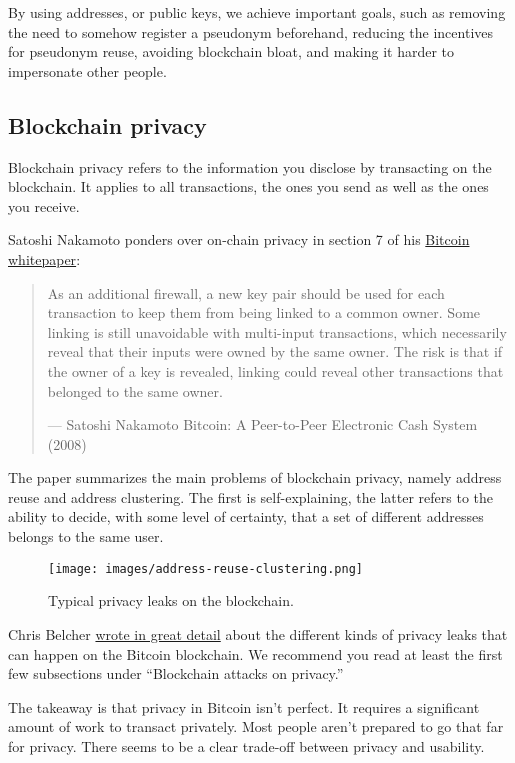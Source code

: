 By using addresses, or public keys, we achieve important goals, such as
removing the need to somehow register a pseudonym beforehand, reducing
the incentives for pseudonym reuse, avoiding blockchain bloat, and
making it harder to impersonate other people.

\hypertarget{blockchainprivacy}{%
\subsection{Blockchain privacy}\label{blockchainprivacy}}

Blockchain privacy refers to the information you disclose by transacting
on the blockchain. It applies to all transactions, the ones you send as
well as the ones you receive.

Satoshi Nakamoto ponders over on-chain privacy in section 7 of his
\href{https://bitcoin.org/bitcoin.pdf}{Bitcoin whitepaper}:

\begin{quote}
As an additional firewall, a new key pair should be used for each
transaction to keep them from being linked to a common owner. Some
linking is still unavoidable with multi-input transactions, which
necessarily reveal that their inputs were owned by the same owner. The
risk is that if the owner of a key is revealed, linking could reveal
other transactions that belonged to the same owner.

---  Satoshi Nakamoto Bitcoin: A Peer-to-Peer Electronic Cash System
(2008)
\end{quote}

The paper summarizes the main problems of blockchain privacy, namely
address reuse and address clustering. The first is self-explaining, the
latter refers to the ability to decide, with some level of certainty,
that a set of different addresses belongs to the same user.

\begin{figure}
\centering
\texttt{[image: images/address-reuse-clustering.png]}
\caption{Typical privacy leaks on the blockchain.}
\end{figure}

Chris Belcher
\href{https://en.bitcoin.it/Privacy\#Blockchain_attacks_on_privacy}{wrote
in great detail} about the different kinds of privacy leaks that can
happen on the Bitcoin blockchain. We recommend you read at least the
first few subsections under ``Blockchain attacks on privacy.''

The takeaway is that privacy in Bitcoin isn't perfect. It requires a
significant amount of work to transact privately. Most people aren't
prepared to go that far for privacy. There seems to be a clear trade-off
between privacy and usability.

